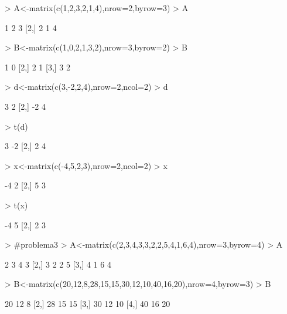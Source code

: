 \documentclass{article}
\begin{document}
\begin{Schunk}
\begin{Sinput}
> A<-matrix(c(1,2,3,2,1,4),nrow=2,byrow=3)
> A
\end{Sinput}
\begin{Soutput}
     [,1] [,2] [,3]
[1,]    1    2    3
[2,]    2    1    4
\end{Soutput}
\begin{Sinput}
> B<-matrix(c(1,0,2,1,3,2),nrow=3,byrow=2)
> B
\end{Sinput}
\begin{Soutput}
     [,1] [,2]
[1,]    1    0
[2,]    2    1
[3,]    3    2
\end{Soutput}
\begin{Sinput}
> d<-matrix(c(3,-2,2,4),nrow=2,ncol=2)
> d
\end{Sinput}
\begin{Soutput}
     [,1] [,2]
[1,]    3    2
[2,]   -2    4
\end{Soutput}
\begin{Sinput}
> t(d)
\end{Sinput}
\begin{Soutput}
     [,1] [,2]
[1,]    3   -2
[2,]    2    4
\end{Soutput}
\begin{Sinput}
> x<-matrix(c(-4,5,2,3),nrow=2,ncol=2)
> x
\end{Sinput}
\begin{Soutput}
     [,1] [,2]
[1,]   -4    2
[2,]    5    3
\end{Soutput}
\begin{Sinput}
> t(x)
\end{Sinput}
\begin{Soutput}
     [,1] [,2]
[1,]   -4    5
[2,]    2    3
\end{Soutput}
\begin{Sinput}
> #problema3
> A<-matrix(c(2,3,4,3,3,2,2,5,4,1,6,4),nrow=3,byrow=4)
> A
\end{Sinput}
\begin{Soutput}
     [,1] [,2] [,3] [,4]
[1,]    2    3    4    3
[2,]    3    2    2    5
[3,]    4    1    6    4
\end{Soutput}
\begin{Sinput}
> B<-matrix(c(20,12,8,28,15,15,30,12,10,40,16,20),nrow=4,byrow=3)
> B
\end{Sinput}
\begin{Soutput}
     [,1] [,2] [,3]
[1,]   20   12    8
[2,]   28   15   15
[3,]   30   12   10
[4,]   40   16   20
\end{Soutput}
\begin{Sinput}

\end{Sinput}
\end{Schunk}
\end{document}

